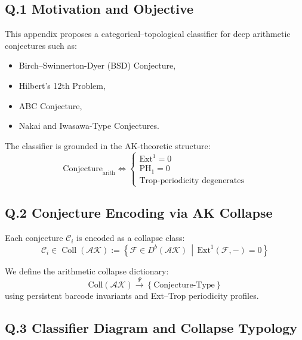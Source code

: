 \documentclass[11pt]{article}
\begin{document}
\subsection*{Q.1 Motivation and Objective}

This appendix proposes a categorical–topological classifier for deep arithmetic conjectures such as:

\begin{itemize}
  \item Birch–Swinnerton-Dyer (BSD) Conjecture,
  \item Hilbert's 12th Problem,
  \item ABC Conjecture,
  \item Nakai and Iwasawa-Type Conjectures.
\end{itemize}

The classifier is grounded in the AK-theoretic structure:
\[
\mathrm{Conjecture}_{\mathrm{arith}} \Longleftrightarrow 
\left\{
  \begin{array}{l}
    \mathrm{Ext}^1 = 0 \\
    \mathrm{PH}_1 = 0 \\
    \text{Trop-periodicity degenerates}
  \end{array}
\right.
\]

\subsection*{Q.2 Conjecture Encoding via AK Collapse}

Each conjecture \( \mathcal{C}_i \) is encoded as a collapse class:
\[
\mathcal{C}_i \in \operatorname{Coll}(\mathcal{AK}) := 
\left\{ \mathcal{F} \in D^b(\mathcal{AK}) \,\middle|\, \mathrm{Ext}^1(\mathcal{F}, -) = 0 \right\}
\]

We define the arithmetic collapse dictionary:
\[
\mathrm{Coll}(\mathcal{AK}) \xrightarrow{\Psi} \left\{ \text{Conjecture-Type} \right\}
\]
using persistent barcode invariants and Ext–Trop periodicity profiles.

\subsection*{Q.3 Classifier Diagram and Collapse Typology}

\vspace{1em}
\begin{center}
\end{center}
\vspace{1em}
\end{document}
